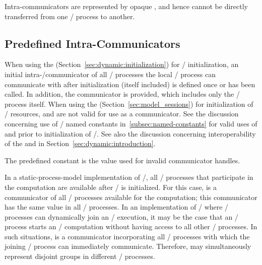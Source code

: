 Intra-communicators are represented by opaque , and hence cannot be directly transferred from one \MPI/ process to
another.

\subsection{Predefined Intra-Communicators}
\label{sec:predef-comms}

When using the \wpm{} (Section~\ref{sec:dynamic:initialization}) for \MPI/ initialization\mpitermindex{\wpm}, an initial intra\hyphen/communicator  of all \MPI/ processes the
local \MPI/ process can communicate with after initialization (itself included) is
defined once 
or 
has been called. In addition,
the communicator  is provided, which includes
only the \MPI/ process itself.
When using the \spm{}
(Section~\ref{sec:model_sessions})\mpitermindex{\spm}
for initialization of \MPI/ resources,
 and  are not valid for use as a communicator.
See the discussion concerning use of \MPI/ named constants in~\ref{subsec:named-constants}
for valid uses of  and  prior to initialization of \MPI/.
See also the discussion concerning interoperability of the \wpm{} and \spm{} in Section~\ref{sec:dynamic:introduction}.

The predefined constant
 is the value used for invalid communicator handles.

In a static-process-model implementation of \MPI/, all \MPI/ processes that
participate in the computation are available after \MPI/ is initialized. For
this case,  is a communicator of all \MPI/ processes
available for the computation; this communicator has the same value in all
\MPI/ processes. In an implementation of \MPI/ where \MPI/ processes can dynamically join
an \MPI/ execution, it may be the case that an \MPI/ process starts an \MPI/ computation
without having access to all other \MPI/ processes. In such situations,
 is a communicator incorporating all \MPI/ processes with
which the joining \MPI/ process can immediately communicate. Therefore,
 may simultaneously
represent disjoint groups
in different \MPI/ processes.

